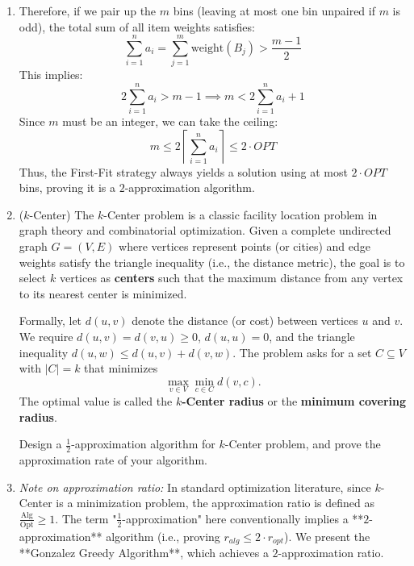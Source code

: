 \documentclass[12pt,a4paper]{article}
\makeatletter
\newtheorem*{solution}{Solution}
\theoremstyle{definition}
\renewenvironment{solution}[1][Solution] {\par\pushQED{\qed}\normalfont\topsep6\p@\@plus6\p@\relax\trivlist\item[\hskip\labelsep\bfseries#1\@addpunct{.}]\ignorespaces}{\popQED\endtrivlist\@endpefalse} \makeatother
\makeatother
\begin{document}
\begin{enumerate}
\begin{solution}
  Therefore, if we pair up the $m$ bins (leaving at most one bin unpaired if $m$ is odd), the total sum of all item weights satisfies:
  \[
  \sum_{i=1}^n a_i = \sum_{j=1}^m \text{weight}(B_j) > \frac{m-1}{2}
  \]
  This implies:
  \[
  2 \sum_{i=1}^n a_i > m - 1 \implies m < 2 \sum_{i=1}^n a_i + 1
  \]
  Since $m$ must be an integer, we can take the ceiling:
  \[
  m \le 2 \left\lceil \sum_{i=1}^n a_i \right\rceil \le 2 \cdot OPT
  \]
  Thus, the First-Fit strategy always yields a solution using at most $2 \cdot OPT$ bins, proving it is a $2$-approximation algorithm.
  \end{solution}

  \item {\color{purple}($k$-Center)} The $k$-Center problem is a classic facility location problem in graph theory and combinatorial optimization. Given a complete undirected graph $G = (V, E)$ where vertices represent points (or cities) and edge weights satisfy the triangle inequality (i.e., the distance metric), the goal is to select $k$ vertices as \textbf{centers} such that the maximum distance from any vertex to its nearest center is minimized.

    Formally, let $d(u,v)$ denote the distance (or cost) between vertices $u$ and $v$. We require $d(u,v) = d(v,u) \ge 0$, $d(u,u)=0$, and the triangle inequality $d(u,w) \le d(u,v)+d(v,w)$. The problem asks for a set $C \subseteq V$ with $|C| = k$ that minimizes
    \[
    \max_{v \in V} \min_{c \in C} d(v,c).
    \]
    The optimal value is called the \textbf{$k$-Center radius} or the \textbf{minimum covering radius}.

    Design a $\frac{1}{2}$-approximation algorithm for $k$-Center problem, and prove the approximation rate of your algorithm.

  \begin{solution}
  \textit{Note on approximation ratio:} In standard optimization literature, since $k$-Center is a minimization problem, the approximation ratio is defined as $\frac{\text{Alg}}{\text{Opt}} \ge 1$. The term "$\frac{1}{2}$-approximation" here conventionally implies a **$2$-approximation** algorithm (i.e., proving $r_{alg} \le 2 \cdot r_{opt}$). We present the **Gonzalez Greedy Algorithm**, which achieves a $2$-approximation ratio.

  \begin{algorithm}[H]
  \caption{Gonzalez Greedy Algorithm for $k$-Center}
  

\end{algorithm}
\end{solution}
\end{enumerate}
\end{document}
